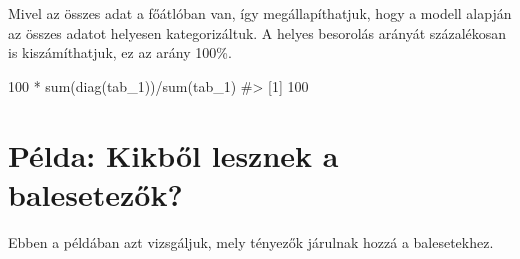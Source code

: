 \documentclass[
  letterpaper,
]{krantz}
\makeatletter
\newenvironment{Shaded}{\begin{snugshade}}{\end{snugshade}}
\newcommand{\CommentTok}[1]{\textcolor[rgb]{0.37,0.37,0.37}{#1}}
\newcommand{\DecValTok}[1]{\textcolor[rgb]{0.68,0.00,0.00}{#1}}
\newcommand{\FunctionTok}[1]{\textcolor[rgb]{0.28,0.35,0.67}{#1}}
\newcommand{\NormalTok}[1]{\textcolor[rgb]{0.00,0.23,0.31}{#1}}
\newcommand{\SpecialCharTok}[1]{\textcolor[rgb]{0.37,0.37,0.37}{#1}}
\newenvironment{kframe}{%
\medskip{}
\setlength{\fboxsep}{.8em}
 \def\at@end@of@kframe{}%
 \ifinner\ifhmode%
  \def\at@end@of@kframe{\end{minipage}}%
  \begin{minipage}{\columnwidth}%
 \fi\fi%
 \def\FrameCommand##1{\hskip\@totalleftmargin \hskip-\fboxsep
 \colorbox{shadecolor}{##1}\hskip-\fboxsep
     \hskip-\linewidth \hskip-\@totalleftmargin \hskip\columnwidth}%
 \MakeFramed {\advance\hsize-\width
   \@totalleftmargin\z@ \linewidth\hsize
   \@setminipage}}%
 {\par\unskip\endMakeFramed%
 \at@end@of@kframe}
\renewenvironment{Shaded}{\begin{kframe}}{\end{kframe}}
\makeatother
\begin{document}
Mivel az összes adat a főátlóban van, így megállapíthatjuk, hogy a
modell alapján az összes adatot helyesen kategorizáltuk. A helyes
besorolás arányát százalékosan is kiszámíthatjuk, ez az arány 100\%.

\begin{Shaded}
\begin{Highlighting}[]
\DecValTok{100} \SpecialCharTok{*} \FunctionTok{sum}\NormalTok{(}\FunctionTok{diag}\NormalTok{(tab\_1))}\SpecialCharTok{/}\FunctionTok{sum}\NormalTok{(tab\_1)}
\CommentTok{\#\textgreater{} [1] 100}
\end{Highlighting}
\end{Shaded}

\hypertarget{puxe9lda-kikbux151l-lesznek-a-balesetezux151k}{%
\section{Példa: Kikből lesznek a
balesetezők?}\label{puxe9lda-kikbux151l-lesznek-a-balesetezux151k}}

Ebben a példában azt vizsgáljuk, mely tényezők járulnak hozzá a
balesetekhez.
\end{document}
